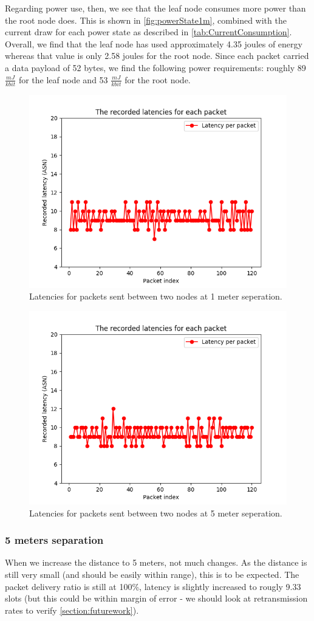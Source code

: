 \documentclass[conference]{IEEEtran}
\begin{document}
Regarding power use, then, we see that the leaf node consumes more power than the root node does. This is shown in \ref{fig:powerState1m}, combined with the current draw for each power state as described in \ref{tab:CurrentConsumption}. Overall, we find that the leaf node has used approximately 4.35 joules of energy whereas that value is only 2.58 joules for the root node. Since each packet carried a data payload of 52 bytes, we find the following power requirements: roughly 89 $\frac{mJ}{kbit}$ for the leaf node and  53 $\frac{mJ}{kbit}$ for the root node.

\begin{figure}[]
	\centering
	\includegraphics[width=.5\textwidth,keepaspectratio]{1m_latencies.png}
	\caption{Latencies for packets sent between two nodes at 1 meter seperation.}
	\label{fig:latencies1m}
\end{figure}
\begin{figure}[]
	\centering
	\includegraphics[width=.5\textwidth,keepaspectratio]{5m_latencies.png}
	\caption{Latencies for packets sent between two nodes at 5 meter seperation.}
	\label{fig:latencies5m}
\end{figure}


\subsubsection{5 meters separation}

When we increase the distance to 5 meters, not much changes. As the distance is still very small (and should be easily within range), this is to be expected. The packet delivery ratio is still at 100\%, latency is slightly increased to rougly 9.33 slots (but this could be within margin of error -  we should look at retransmission rates to verify \ref{section:futurework}). 
\end{document}
